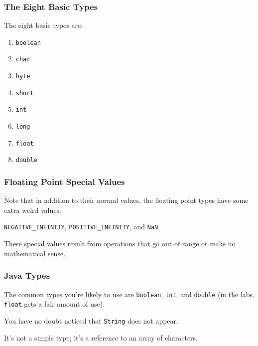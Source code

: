 \begin{frame}
\frametitle{The Eight Basic Types}
\begin{changemargin}{1cm}

The eight basic types are:

\begin{enumerate}
\item \texttt{boolean}
\item \texttt{char}
\item \texttt{byte}
\item \texttt{short}
\item \texttt{int}
\item \texttt{long}
\item \texttt{float}
\item \texttt{double}
\end{enumerate}


\end{changemargin}
\end{frame}

\begin{frame}
\frametitle{Floating Point Special Values}
\begin{changemargin}{1cm}

Note that in addition to their normal values, the floating point types have some extra weird values: 

\texttt{NEGATIVE\_INFINITY}, \texttt{POSITIVE\_INFINITY}, and \texttt{NaN}.

These special values result from operations that go out of range or make no mathematical sense.

\end{changemargin}
\end{frame}

\begin{frame}
\frametitle{Java Types}
\begin{changemargin}{1cm}

The common types you're likely to use are \texttt{boolean}, \texttt{int}, and \texttt{double} (in the labs, \texttt{float} gets a fair amount of use).

You have no doubt noticed that \texttt{String} does not appear.

It's not a simple type; it's a reference to an array of characters.

\end{changemargin}
\end{frame}


